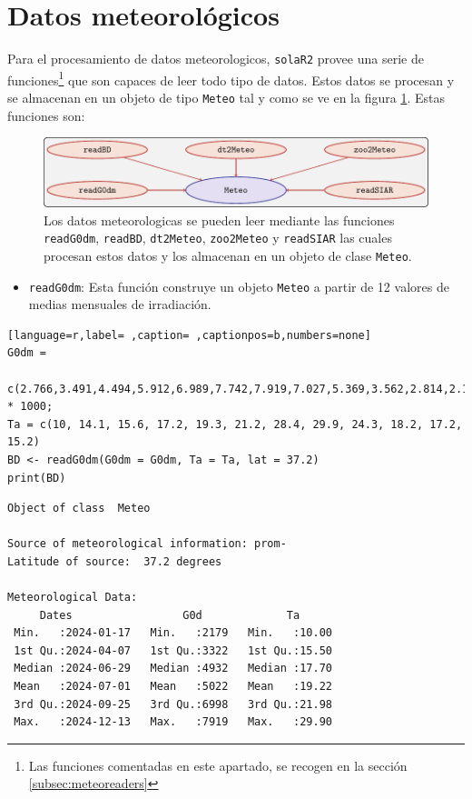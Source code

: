 \section{Datos meteorológicos}
\label{sec:org9776bef}
\label{sec:datos-meteorologicos}
Para el procesamiento de datos meteorologicos, \texttt{solaR2} provee una serie de funciones\footnote{Las funciones comentadas en este apartado, se recogen en la sección \ref{subsec:meteoreaders}} que son capaces de leer todo tipo de datos. Estos datos se procesan y se almacenan en un objeto de tipo \texttt{Meteo} tal y como se ve en la figura \ref{fig:meteo}. Estas funciones son:
\begin{figure}[]
\centering
\includegraphics[keepaspectratio,width=\textwidth,height=0.5\textheight]{figuras/meteo.pdf}
\caption{Los datos meteorologicas se pueden leer mediante las funciones \texttt{readG0dm}, \texttt{readBD}, \texttt{dt2Meteo}, \texttt{zoo2Meteo} y \texttt{readSIAR} las cuales procesan estos datos y los almacenan en un objeto de clase \texttt{Meteo}. \label{fig:meteo}}
\end{figure}
\begin{itemize}
\item \texttt{readG0dm}: Esta función construye un objeto \texttt{Meteo} a partir de 12 valores de medias mensuales de irradiación.
\end{itemize}
\begin{lstlisting}[language=r,label= ,caption= ,captionpos=b,numbers=none]
G0dm =
  c(2.766,3.491,4.494,5.912,6.989,7.742,7.919,7.027,5.369,3.562,2.814,2.179) * 1000;
Ta = c(10, 14.1, 15.6, 17.2, 19.3, 21.2, 28.4, 29.9, 24.3, 18.2, 17.2, 15.2)
BD <- readG0dm(G0dm = G0dm, Ta = Ta, lat = 37.2)
print(BD)
\end{lstlisting}

\begin{verbatim}
Object of class  Meteo 

Source of meteorological information: prom- 
Latitude of source:  37.2 degrees

Meteorological Data:
     Dates                 G0d             Ta       
 Min.   :2024-01-17   Min.   :2179   Min.   :10.00  
 1st Qu.:2024-04-07   1st Qu.:3322   1st Qu.:15.50  
 Median :2024-06-29   Median :4932   Median :17.70  
 Mean   :2024-07-01   Mean   :5022   Mean   :19.22  
 3rd Qu.:2024-09-25   3rd Qu.:6998   3rd Qu.:21.98  
 Max.   :2024-12-13   Max.   :7919   Max.   :29.90
\end{verbatim}

